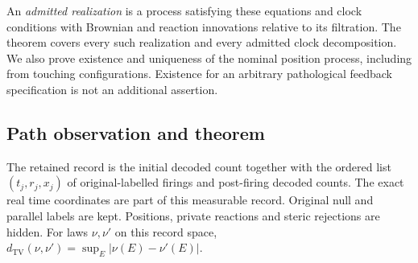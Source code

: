 \documentclass[11pt]{article}
\numberwithin{equation}{section}
\theoremstyle{definition}
\theoremstyle{remark}\newtheorem{remark}[theorem]{Remark}
\newcommand{\TV}{d_{\mathrm{TV}}}
\begin{document}
An \emph{admitted realization} is a process satisfying these equations and
clock conditions with Brownian and reaction innovations relative to its
filtration. The theorem covers every such realization and every admitted
clock decomposition. We also prove existence and uniqueness of the nominal
position process, including from touching configurations. Existence for an
arbitrary pathological feedback specification is not an additional assertion.

\subsection{Path observation and theorem}

The retained record is the initial decoded count together with the ordered
list $(t_j,r_j,x_j)$ of original-labelled firings and post-firing decoded
counts. The exact real time coordinates are part of this measurable record.
Original null and parallel labels are kept. Positions, private reactions and
steric rejections are hidden. For laws $\nu,\nu'$ on this record space,
$\TV(\nu,\nu')=\sup_E|\nu(E)-\nu'(E)|$.
\end{document}
